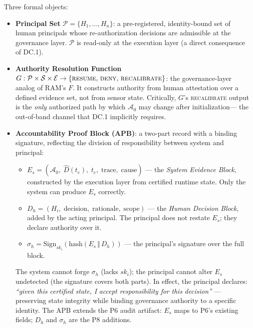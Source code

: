 \documentclass[11pt]{article}
\newcommand{\Azero}{\mathcal{A}_0}
\newcommand{\Dhat}{\widehat{D}}
\begin{document}
Three formal objects:
\begin{itemize}[leftmargin=2em, topsep=2pt]
  \item \textbf{Principal Set} $\mathcal{P} = \{H_1,\ldots,H_n\}$:
        a pre-registered, identity-bound set of human principals whose
        re-authorization decisions are admissible at the governance layer.
        $\mathcal{P}$ is read-only at the execution layer (a direct
        consequence of DC.1).
  \item \textbf{Authority Resolution Function}
        $G: \mathcal{P} \times \mathcal{S} \times \mathcal{E} \to
        \{\textsc{resume},\,\textsc{deny},\,\textsc{recalibrate}\}$:
        the governance-layer analog of RAM's $F$.
        It constructs authority from human attestation over a defined evidence
        set, not from sensor state.
        Critically, $G$'s \textsc{recalibrate} output is the \emph{only}
        authorized path by which $\Azero$ may change after initialization---
        the out-of-band channel that DC.1 implicitly requires.
  \item \textbf{Accountability Proof Block (APB)}: a two-part record with
        a binding signature, reflecting the division of responsibility
        between system and principal:
        \begin{itemize}[leftmargin=1.5em, topsep=1pt]
          \item $E_s = (\Azero,\;\Dhat(t_e),\;t_e,\;\mathrm{trace},\;
                \mathrm{cause})$ --- the \emph{System Evidence Block},
                constructed by the execution layer from certified runtime
                state. Only the system can produce $E_s$ correctly.
          \item $D_h = (H_i,\;\mathrm{decision},\;\mathrm{rationale},\;
                \mathrm{scope})$ --- the \emph{Human Decision Block},
                added by the acting principal. The principal does not
                restate $E_s$; they declare authority over it.
          \item $\sigma_h = \mathrm{Sign}_{sk_i}(\mathrm{hash}(E_s \,\Vert\,
                D_h))$ --- the principal's signature over the full block.
        \end{itemize}
        The system cannot forge $\sigma_h$ (lacks $sk_i$); the principal
        cannot alter $E_s$ undetected (the signature covers both parts).
        In effect, the principal declares: \emph{``given this certified
        state, I accept responsibility for this decision''} --- preserving
        state integrity while binding governance authority to a specific
        identity. The APB extends the P6 audit artifact: $E_s$ maps to
        P6's existing fields; $D_h$ and $\sigma_h$ are the P8 additions.
\end{itemize}
\end{document}
